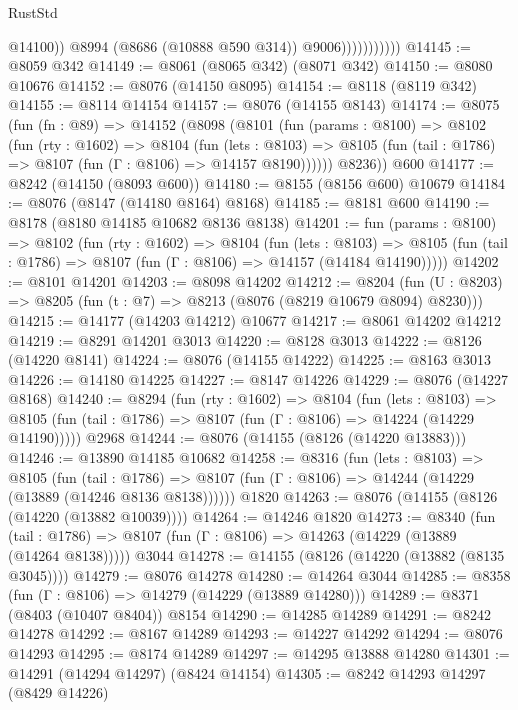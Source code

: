 \begin{lexlean}{RustStd}
\begin{coremodule}
                              @14100))
                          @8994
                          (@8686 (@10888 @590 @314))
                          @9006)))))))))))
@14145 := @8059 @342
@14149 := @8061 (@8065 @342) (@8071 @342)
@14150 := @8080 @10676
@14152 := @8076 (@14150 @8095)
@14154 := @8118 (@8119 @342)
@14155 := @8114 @14154
@14157 := @8076 (@14155 @8143)
@14174 := @8075
    (fun (fn : @89) =>
    @14152
      (@8098
        (@8101
          (fun (params : @8100) =>
          @8102
            (fun (rty : @1602) =>
            @8104
              (fun (lets : @8103) =>
              @8105 (fun (tail : @1786) => @8107 (fun (Γ : @8106) => @14157 @8190))))))
        @8236))
    @600
@14177 := @8242 (@14150 (@8093 @600))
@14180 := @8155 (@8156 @600) @10679
@14184 := @8076 (@8147 (@14180 @8164) @8168)
@14185 := @8181 @600
@14190 := @8178 (@8180 @14185 @10682 @8136 @8138)
@14201 := fun (params : @8100) =>
  @8102
    (fun (rty : @1602) =>
    @8104
      (fun (lets : @8103) =>
      @8105 (fun (tail : @1786) => @8107 (fun (Γ : @8106) => @14157 (@14184 @14190)))))
@14202 := @8101 @14201
@14203 := @8098 @14202
@14212 := @8204
    (fun (U : @8203) => @8205 (fun (t : @7) => @8213 (@8076 (@8219 @10679 @8094) @8230)))
@14215 := @14177 (@14203 @14212) @10677
@14217 := @8061 @14202 @14212
@14219 := @8291 @14201 @3013
@14220 := @8128 @3013
@14222 := @8126 (@14220 @8141)
@14224 := @8076 (@14155 @14222)
@14225 := @8163 @3013
@14226 := @14180 @14225
@14227 := @8147 @14226
@14229 := @8076 (@14227 @8168)
@14240 := @8294
    (fun (rty : @1602) =>
    @8104
      (fun (lets : @8103) =>
      @8105 (fun (tail : @1786) => @8107 (fun (Γ : @8106) => @14224 (@14229 @14190)))))
    @2968
@14244 := @8076 (@14155 (@8126 (@14220 @13883)))
@14246 := @13890 @14185 @10682
@14258 := @8316
    (fun (lets : @8103) =>
    @8105
      (fun (tail : @1786) =>
      @8107 (fun (Γ : @8106) => @14244 (@14229 (@13889 (@14246 @8136 @8138))))))
    @1820
@14263 := @8076 (@14155 (@8126 (@14220 (@13882 @10039))))
@14264 := @14246 @1820
@14273 := @8340
    (fun (tail : @1786) => @8107 (fun (Γ : @8106) => @14263 (@14229 (@13889 (@14264 @8138)))))
    @3044
@14278 := @14155 (@8126 (@14220 (@13882 (@8135 @3045))))
@14279 := @8076 @14278
@14280 := @14264 @3044
@14285 := @8358 (fun (Γ : @8106) => @14279 (@14229 (@13889 @14280)))
@14289 := @8371 (@8403 (@10407 @8404)) @8154
@14290 := @14285 @14289
@14291 := @8242 @14278
@14292 := @8167 @14289
@14293 := @14227 @14292
@14294 := @8076 @14293
@14295 := @8174 @14289
@14297 := @14295 @13888 @14280
@14301 := @14291 (@14294 @14297) (@8424 @14154)
@14305 := @8242 @14293 @14297 (@8429 @14226)

\end{coremodule}
\end{lexlean}

